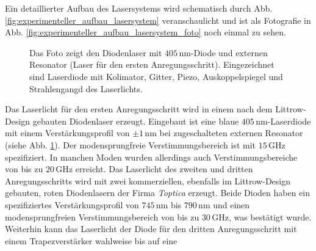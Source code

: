 Ein detaillierter Aufbau des Lasersystems wird schematisch durch Abb.
\ref{fig:experimenteller_aufbau_lasersystem} veranschaulicht und ist als
Fotografie in Abb. \ref{fig:experimenteller_aufbau_lasersystem_foto} noch einmal
zu sehen.\par
\begin{figure}[h]
 	\centering
	\caption[Diodenlaser - Foto]{Das Foto zeigt den Diodenlaser mit
	$405\,$nm-Diode und externen
	Resonator (Laser für den ersten
	Anregungsschritt).
	Eingezeichnet sind
	Laserdiode mit Kolimator,
	Gitter, Piezo,
	Auskoppelspiegel und
	Strahlengangd des
	Laserlichts.}\label{fig:experimenteller_aufbau_diodenlaser_foto}
\end{figure}
Das Laserlicht für den ersten Anregungsschritt wird in einem nach dem
Littrow-Design gebauten Diodenlaser erzeugt. Eingebaut ist eine blaue
$405\,$nm-Laserdiode mit einem Verstärkungsprofil von $\pm1\,$nm bei
zugeschalteten externen Resonator (siehe Abb.
\ref{fig:experimenteller_aufbau_diodenlaser_foto}). Der modensprungfreie Verstimmungsbereich ist mit $15\,$GHz spezifiziert. In manchen Moden wurden allerdings auch Verstimmungsbereiche
von bis zu $20\,$GHz erreicht. Das Laserlicht des zweiten und dritten
Anregungsschritts wird mit zwei kommerziellen, ebenfalls im Littrow-Design
gebauten, roten Diodenlasern der Firma \textit{Toptica} erzeugt.
Beide Dioden haben ein spezifiziertes Verstärkungsprofil von
$745\,$nm bis $790\,$nm und einen modensprungfreien Verstimmungsbereich von bis
zu $30\,$GHz, was bestätigt wurde. Weiterhin kann das Laserlicht der Diode für
den dritten Anregungsschritt mit einem Trapezverstärker wahlweise bis auf eine
